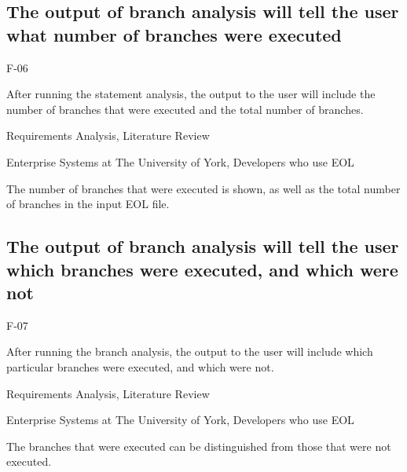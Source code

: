 \subsection{The output of branch analysis will tell the user what number of branches were executed}
\begin{description}[style=sameline,leftmargin=4.5cm,nolistsep]
\item[\hspace*{0.3cm}Label] F-06
\item[\hspace*{0.3cm}Description] After running the statement analysis, the output to the user will include the number of branches that were executed and the total number of branches.
\item[\hspace*{0.3cm}Source] Requirements Analysis, Literature Review
\item[\hspace*{0.3cm}Stakeholders] Enterprise Systems at The University of York, Developers who use EOL
\item[\hspace*{0.3cm}Satisfiable Conditions] The number of branches that were executed is shown, as well as the total number of branches in the input EOL file.
\end{description}

\subsection{The output of branch analysis will tell the user which branches were executed, and which were not}
\begin{description}[style=sameline,leftmargin=4.5cm,nolistsep]
\item[\hspace*{0.3cm}Label] F-07
\item[\hspace*{0.3cm}Description] After running the branch analysis, the output to the user will include which particular branches were executed, and which were not.
\item[\hspace*{0.3cm}Source] Requirements Analysis, Literature Review
\item[\hspace*{0.3cm}Stakeholders] Enterprise Systems at The University of York, Developers who use EOL
\item[\hspace*{0.3cm}Satisfiable Conditions] The branches that were executed can be distinguished from those that were not executed.
\end{description}

